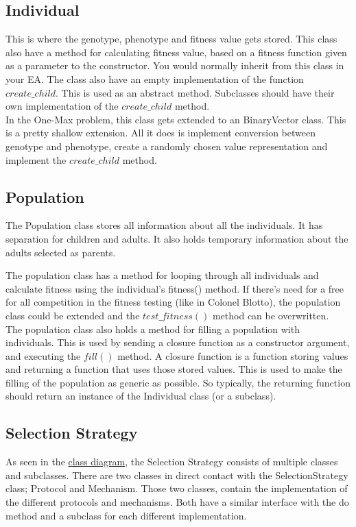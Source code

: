 \subsection{Individual}
This is where the genotype, phenotype and fitness value gets stored. This class also have 
a method for calculating fitness value, based on a fitness function given as a parameter to
the constructor. You would normally inherit from this class in your EA.
The class also have an empty implementation of the function $create\_child$. This is used as an
abstract method. Subclasses should have their own implementation of the $create\_child$ method. \\


In the One-Max problem, this class gets extended to an BinaryVector class. This is a pretty shallow
extension. All it does is implement conversion between genotype and phenotype, create a randomly
chosen value representation and implement the $create\_child$ method.

\subsection{Population}
The Population class stores all information about all the individuals. It has separation for children and adults.
It also holds temporary information about the adults selected as parents. 

The population class has a method for looping through all individuals and calculate fitness using the individual's
fitness() method. If there's need for a free for all competition in the fitness testing (like in Colonel Blotto), the 
population class could be extended and the $test\_fitness()$ method can be overwritten. \\

The population class also holds a method for filling a population with individuals. This is used by sending a 
closure function as a constructor argument, and executing the $fill()$ method. A closure function is a function
storing values and returning a function that uses those stored values. This is used to make the filling of the
population as generic as possible. So typically, the returning function should return an instance of the Individual
class (or a subclass).

\subsection{Selection Strategy}
As seen in the \hyperref[fig:classdiagram]{class diagram}, the Selection Strategy consists of multiple classes
and subclasses. There are two classes in direct contact with the SelectionStrategy class; Protocol and Mechanism.
Those two classes, contain the implementation of the different protocols and mechanisms. Both have a similar
interface with the do method and a subclass for each different implementation.

